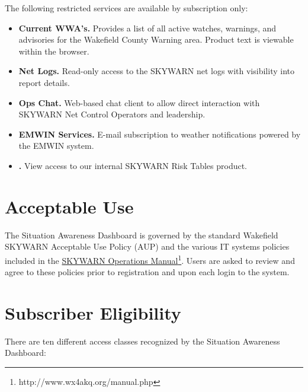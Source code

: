\documentclass[pdflatex,letterpaper,twoside,12pt]{book}
\begin{document}
The following restricted services are available by subscription only:

\begin{itemize}
\item {\bf Current WWA's.}  Provides a list of all active watches, warnings, and advisories for the Wakefield County Warning area.  Product text is viewable within the browser.
\item {\bf Net Logs.}  Read-only access to the SKYWARN net logs with visibility into report details.
\item {\bf Ops Chat.}  Web-based chat client to allow direct interaction with SKYWARN Net Control Operators and leadership.
\item {\bf EMWIN Services.}  E-mail subscription to weather notifications powered by the EMWIN system.
\item {\bf {}.}  View access to our internal SKYWARN Risk Tables product.
\end{itemize}


\section{Acceptable Use}

The Situation Awareness Dashboard is governed by the standard Wakefield SKYWARN Acceptable Use Policy (AUP) and the various IT systems policies included in the \href{http://www.wx4akq.org/manual.php}{SKYWARN Operations Manual\footnote{http://www.wx4akq.org/manual.php}}.  Users are asked to review and agree to these policies prior to registration and upon each login to the system.

\label{sec:eligibility}
\section{Subscriber Eligibility}

There are ten different access classes recognized by the Situation Awareness Dashboard:
\end{document}
